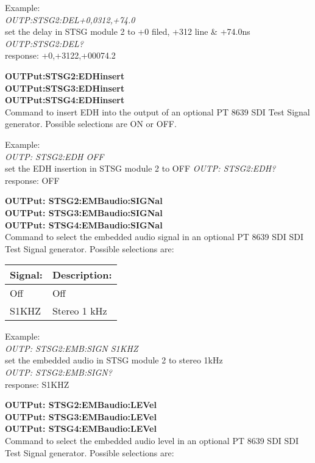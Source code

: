 Example:\\
\textit{OUTP:STSG2:DEL+0,0312,+74.0}\\
set the delay in STSG module 2 to +0 filed, +312 line \& +74.0ns\\
\textit{OUTP:STSG2:DEL?}\\
response: +0,+3122,+00074.2

\textbf{OUTPut:STSG2:EDHinsert}\\
\textbf{OUTPut:STSG3:EDHinsert}\\
\textbf{OUTPut:STSG4:EDHinsert}\\
Command to insert EDH into the output of an optional PT 8639 SDI Test Signal generator. Possible selections are ON or OFF.

Example:\\
\textit{OUTP: STSG2:EDH OFF}\\
set the EDH insertion in STSG module 2 to OFF
\textit{OUTP: STSG2:EDH?}\\
response: OFF

\textbf{OUTPut: STSG2:EMBaudio:SIGNal}\\
\textbf{OUTPut: STSG3:EMBaudio:SIGNal}\\
\textbf{OUTPut: STSG4:EMBaudio:SIGNal}\\
Command to select the embedded audio signal in an optional PT 8639 SDI SDI Test Signal generator. Possible selections are:

\begin{tabular}{|l|l|}
\hline
\textbf{Signal:} & \textbf{Description:} \\ \hline
Off		& Off \\ \hline
S1KHZ & Stereo 1 kHz \\ \hline
\end{tabular}

Example:\\
\textit{OUTP: STSG2:EMB:SIGN S1KHZ}\\
set the embedded audio in STSG module 2 to stereo 1kHz\\
\textit{OUTP: STSG2:EMB:SIGN?}\\
response: S1KHZ

\textbf{OUTPut: STSG2:EMBaudio:LEVel}\\
\textbf{OUTPut: STSG3:EMBaudio:LEVel}\\
\textbf{OUTPut: STSG4:EMBaudio:LEVel}\\
Command to select the embedded audio level in an optional PT 8639 SDI SDI Test Signal generator. Possible selections are:

